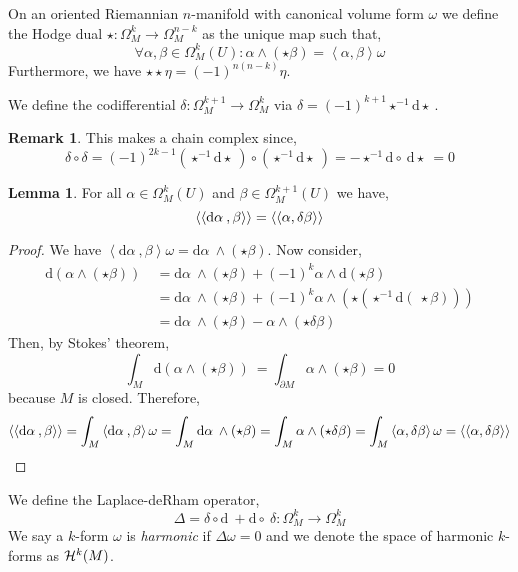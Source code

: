 \documentclass[12pt]{extarticle}
\renewcommand{\d}[1]{ \mathrm{d}#1 \:}
\theoremstyle{definition}
\newtheorem{lemma}[theorem]{Lemma}
\newtheorem{remark}{Remark}
\newenvironment{definition}[1][Definition:]{\begin{trivlist}
\item[\hskip \labelsep {\bfseries #1}]}{\end{trivlist}}
\newcommand{\inner}[2]{\left< #1, #2 \right>}
\begin{document}
\begin{definition}
On an oriented Riemannian $n$-manifold with canonical volume form $\omega$ we define the Hodge dual $\star : \Omega^k_M \to \Omega^{n - k}_M$ as the unique map such that, \[ \forall \alpha, \beta \in \Omega^k_M(U) : \alpha \wedge (\star \beta) = \inner{\alpha}{\beta} \omega \]
Furthermore, we have $\star \star \eta = (-1)^{n(n-k)} \eta$. 
\end{definition}

\begin{definition}
We define the codifferential $\delta : \Omega^{k+1}_M \to \Omega^k_M$ via $\delta = (-1)^{k+1} \star^{-1} \d \star$. 
\end{definition}

\begin{remark}
This makes a chain complex since,
\[ \delta \circ \delta = (-1)^{2k - 1} (\star^{-1} \d \star) \circ (\star^{-1} \d \star) = - \star^{-1} \d \circ \d \star = 0 \]
\end{remark}

\begin{lemma}
For all $\alpha \in \Omega_M^k(U)$ and $\beta \in \Omega_M^{k+1}(U)$ we have,
\[ \Inner{\d{\alpha}}{\beta} = \Inner{\alpha}{\delta \beta} \] 
\end{lemma}

\begin{proof}
We have $\inner{\d{\alpha}}{\beta} \omega = \d{\alpha} \wedge (\star \beta)$. Now consider,
\begin{align*}
\d{( \alpha \wedge ( \star \beta ))} & = \d{\alpha} \wedge (\star \beta) + (-1)^k \alpha \wedge \d{(\star \beta)} 
\\
& = \d{\alpha} \wedge (\star \beta) + (-1)^k \alpha \wedge (\star (\star^{-1} \d (\star \beta ))) 
\\
& = \d{\alpha} \wedge (\star \beta) - \alpha \wedge (\star \delta \beta )
\end{align*}
Then, by Stokes' theorem,
\[ \int_M \d{(\alpha \wedge (\star \beta))} = \int_{\partial M} \alpha \wedge (\star \beta) = 0 \]
because $M$ is closed. Therefore,
\[ \Inner{\d{\alpha}}{\beta} = \int_M \inner{\d{\alpha}}{\beta} \omega = \int_M \d{\alpha} \wedge (\star \beta) = \int_M \alpha \wedge (\star \delta \beta ) = \int_M \inner{\alpha}{\delta \beta} \omega = \Inner{\alpha}{\delta \beta} \]
\end{proof}

\begin{definition}
We define the Laplace-deRham operator,
\[ \Delta = \delta \circ \d{} + \d \circ \delta : \Omega^k_M \to \Omega^k_M \]
We say a $k$-form $\omega$ is \textit{harmonic} if $\Delta \omega = 0$ and we denote the space of harmonic $k$-forms as $\mathcal{H}^k(M)$. 
\end{definition}
\end{document}

